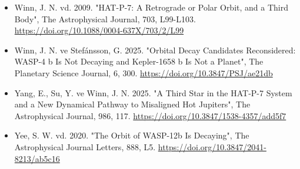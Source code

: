 \begin{itemize}[leftmargin=1em,itemsep=1pt]
\item Winn, J. N. vd. 2009. "HAT-P-7: A Retrograde or Polar Orbit, and a Third Body", The Astrophysical Journal, 703, L99-L103. \url{https://doi.org/10.1088/0004-637X/703/2/L99}
\item Winn, J. N. ve Stefánsson, G. 2025. "Orbital Decay Candidates Reconsidered: WASP-4 b Is Not Decaying and Kepler-1658 b Is Not a Planet", The Planetary Science Journal, 6, 300. \url{https://doi.org/10.3847/PSJ/ae21db}
\item Yang, E., Su, Y. ve Winn, J. N. 2025. "A Third Star in the HAT-P-7 System and a New Dynamical Pathway to Misaligned Hot Jupiters", The Astrophysical Journal, 986, 117. \url{https://doi.org/10.3847/1538-4357/add5f7}
\item Yee, S. W. vd. 2020. "The Orbit of WASP-12b Is Decaying", The Astrophysical Journal Letters, 888, L5. \url{https://doi.org/10.3847/2041-8213/ab5c16}
\end{itemize}
